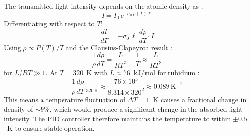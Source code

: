 The transmitted light intensity depends on the atomic density as :
\begin{equation}
    I = I_0\,e^{-\sigma_0\,\rho(T)\,\ell}
\end{equation}
Differentiating with respect to $T$:
\begin{equation}
    \frac{dI}{dT} = -\sigma_0\,\ell\,\frac{d\rho}{dT}\cdot I
\end{equation}
Using $\rho \propto P(T)/T$ and the Clausius-Clapeyron result :
\begin{equation}
    \frac{1}{\rho}\frac{d\rho}{dT} = \frac{L}{RT^2} - \frac{1}{T}
                                    \approx \frac{L}{RT^2}
\end{equation}
for $L/RT \gg 1$. At $T = 320$~K with $L \approx 76$~kJ/mol for rubidium :
\begin{equation}
    \frac{1}{\rho}\frac{d\rho}{dT}\bigg|_{320\,\text{K}}
    \approx \frac{76\times10^3}{8.314\times320^2}
    \approx 0.089\ \text{K}^{-1}
\end{equation}
This means a temperature fluctuation of $\Delta T = 1$~K causes a fractional change
in density of $\sim 9\%$, which would produce a significant change in the absorbed
light intensity. The PID controller therefore maintains the temperature to within
$\pm 0.5$~K to ensure stable operation.